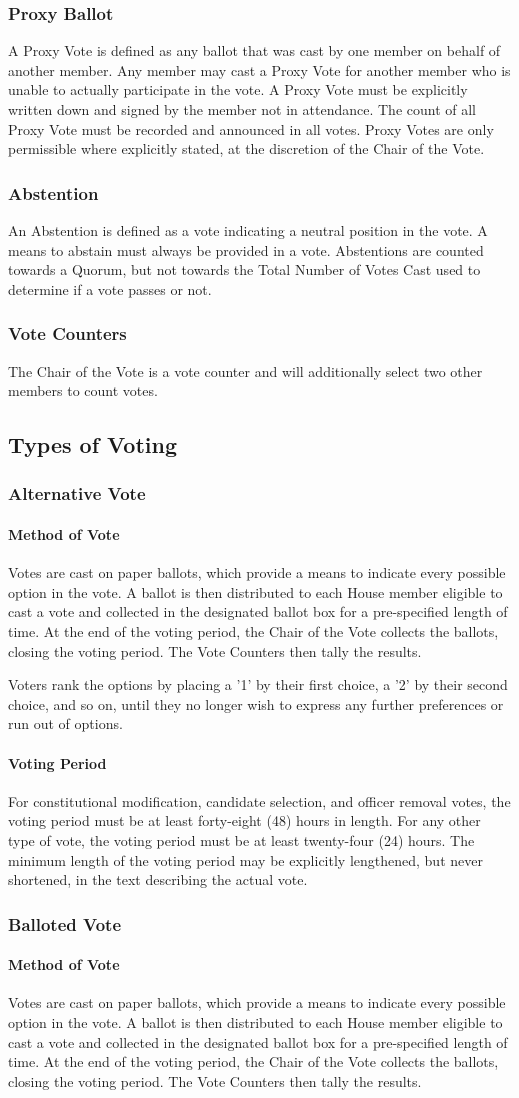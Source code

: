 \documentclass{article}
\newcommand{\asection}[1]{\subsection{#1} \label{#1}}
\newcommand{\asubsection}[1]{\subsubsection{#1} \label{#1}}
\newcommand{\asubsubsection}[1]{\paragraph{#1} \label{#1}}
\begin{document}
\asubsection{Proxy Ballot}
A Proxy Vote is defined as any ballot that was cast by one member on behalf of another member.
Any member may cast a Proxy Vote for another member who is unable to actually participate in the vote.
A Proxy Vote must be explicitly written down and signed by the member not in attendance.
The count of all Proxy Vote must be recorded and announced in all votes.
Proxy Votes are only permissible where explicitly stated, at the discretion of the Chair of the Vote.

\asubsection{Abstention}
An Abstention is defined as a vote indicating a neutral position in the vote.
A means to abstain must always be provided in a vote.
Abstentions are counted towards a Quorum, but not towards the Total Number of Votes Cast used to determine if a vote passes or not.

\asubsection{Vote Counters}
The Chair of the Vote is a vote counter and will additionally select two other members to count votes.

\asection{Types of Voting}

\asubsection{Alternative Vote}

\asubsubsection{Method of Vote}
Votes are cast on paper ballots, which provide a means to indicate every possible option in the vote.
A ballot is then distributed to each House member eligible to cast a vote and collected in the designated ballot box for a pre-specified length of time.
At the end of the voting period, the Chair of the Vote collects the ballots, closing the voting period.
The Vote Counters then tally the results.

Voters rank the options by placing a '1' by their first choice, a '2' by their second choice, and so on, until they no longer wish to express any further preferences or run out of options.

\asubsubsection{Voting Period}
For constitutional modification, candidate selection, and officer removal votes, the voting period must be at least forty-eight (48) hours in length.
For any other type of vote, the voting period must be at least twenty-four (24) hours.
The minimum length of the voting period may be explicitly lengthened, but never shortened, in the text describing the actual vote.

\asubsection{Balloted Vote}

\asubsubsection{Method of Vote}
Votes are cast on paper ballots, which provide a means to indicate every possible option in the vote.
A ballot is then distributed to each House member eligible to cast a vote and collected in the designated ballot box for a pre-specified length of time.
At the end of the voting period, the Chair of the Vote collects the ballots, closing the voting period.
The Vote Counters then tally the results.
\end{document}

